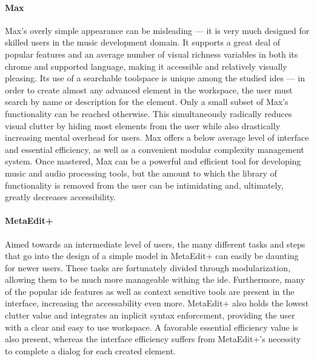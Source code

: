 \paragraph{Max} Max's overly simple appearance can be misleading --- it is
very much designed for skilled users in the music development domain. It
supports a great deal of popular features and an average number of visual
richness variables in both its chrome and supported language, making it
accessible and relatively visually pleasing. Its use of a searchable
toolspace is unique among the studied \acp{ide} --- in order to create
almost any advanced element in the workspace, the user must search by name
or description for the element. Only a small subset of Max's functionality
can be reached otherwise. This simultaneously radically reduces visual
clutter by hiding most elements from the user while also drastically
increasing mental overhead for users. Max offers a below average level of
interface and essential efficiency, as well as a convenient modular
complexity management system. Once mastered, Max can be a powerful and
efficient tool for developing music and audio processing tools, but the
amount to which the library of functionality is removed from the user can
be intimidating and, ultimately, greatly decreases accessibility.

\paragraph{MetaEdit+} Aimed towards an intermediate level of users, the
many different tasks and steps that go into the design of a simple model in
MetaEdit+ can easily be daunting for newer users.  These tasks are
fortunately divided through modularization, allowing them to be much more
manageable withing the \ac{ide}. Furthermore, many of the popular \ac{ide}
features as well as context sensitive tools are present in the interface,
increasing the accessability even more. MetaEdit+ also holds the lowest
clutter value and integrates an inplicit syntax enforcement, providing the
user with a clear and easy to use workspace. A favorable essential
efficiency value is also present, whereas the interface efficiency suffers
from MetaEdit+'s necessity to complete a dialog for each created element.

